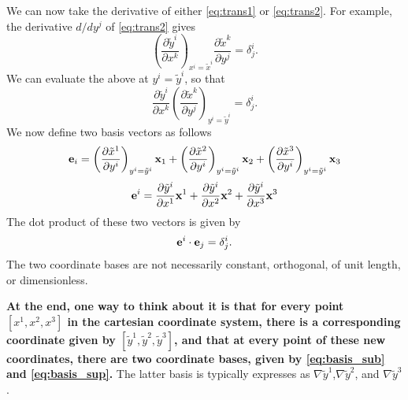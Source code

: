 \documentclass[11pt]{article}
\newcommand{\xtilde}{\tilde{x}}
\newcommand{\ytilde}{\tilde{y}}
\begin{document}
We can now take the derivative of either \cref{eq:trans1} or \cref{eq:trans2}. For example, the derivative $d/dy^j$ of \cref{eq:trans2} gives
\begin{equation}
    \left( \frac{\partial \ytilde^i}{\partial x^k} \right)_{x^i = \xtilde^i} \frac{\partial \xtilde^k}{\partial y^j} = \delta^i_j.
\end{equation}
We can evaluate the above at $y^i = \ytilde^i$, so that
\begin{equation}
     \frac{\partial \ytilde^i}{\partial x^k} \left( \frac{\partial \xtilde^k}{\partial y^j} \right)_{y^i = \ytilde^i} = \delta^i_j.
\end{equation}
We now define two basis vectors as follows
\begin{equation}
\label{eq:basis_sub}
    \evec_i = \left( \frac{ \partial \xtilde^1}{\partial y^i} \right)_{y^i = \ytilde^i} \xvec_1 + \left( \frac{ \partial \xtilde^2}{\partial y^i} \right)_{y^i = \ytilde^i} \xvec_2 + \left( \frac{ \partial \xtilde^3}{\partial y^i} \right)_{y^i = \ytilde^i} \xvec_3
\end{equation}
\begin{equation}
\label{eq:basis_sup}
    \evec^i = \frac{ \partial \ytilde^i}{\partial x^1} \xvec^1 + \frac{ \partial \ytilde^i}{\partial x^2} \xvec^2 + \frac{ \partial \ytilde^i}{\partial x^3} \xvec^3
\end{equation}
The dot product of these two vectors is given by
\begin{equation}
\label{eq:basis_orthogonality}
    \mathbf{e}^i \cdot \mathbf{e}_j = \delta^i_j.
\end{equation}
The two coordinate bases are not necessarily constant, orthogonal, of unit length, or dimensionless.

\textbf{At the end, one way to think about it is that for every point $[x^1,x^2,x^3]$ in the cartesian coordinate system, there is a corresponding coordinate given by $[\ytilde^1,\ytilde^2,\ytilde^3]$, and that at every point of these new coordinates, there are two coordinate bases, given by \cref{eq:basis_sub} and \cref{eq:basis_sup}.} The latter basis is typically expresses as $\nabla \ytilde^1$,$\nabla \ytilde^2$, and $\nabla \ytilde^3$.

\end{document}
